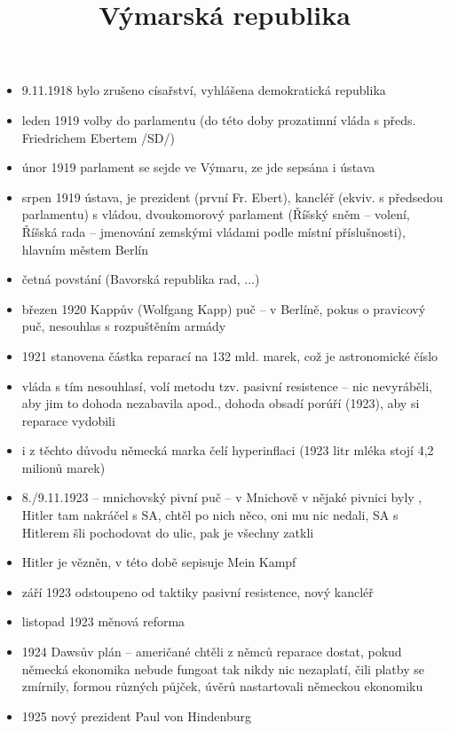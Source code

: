 \documentclass{article}
\title{\vspace{-2cm}\Kapitan Výmarská republika\vspace{-1.7cm}}
\date{}
\author{}
\begin{document}
\maketitle

\begin{itemize}
  \vspace{-0.5em}
  \setlength\itemsep{0.15em}
  \item 9.11.1918 bylo zrušeno císařství, vyhlášena demokratická republika
  \item leden 1919 volby do parlamentu (do této doby prozatimní vláda s předs. Friedrichem Ebertem /SD/)
  \item únor 1919 parlament se sejde ve Výmaru, ze jde sepsána i ústava
  \item srpen 1919 ústava, je prezident (první Fr. Ebert), kancléř (ekviv. s předsedou parlamentu) s vládou, dvoukomorový parlament (Říšský sněm -- volení, Říšská rada -- jmenování zemskými vládami podle místní příslušnosti), hlavním městem Berlín
  \item četná povstání (Bavorská republika rad, ...)
  \item březen 1920 Kappův (Wolfgang Kapp) puč -- v Berlíně, pokus o pravicový puč, nesouhlas s rozpuštěním armády
  \item 1921 stanovena částka reparací na 132 mld. marek, což je astronomické číslo
  \item vláda s tím nesouhlasí, volí metodu tzv. pasivní resistence -- nic nevyráběli, aby jim to dohoda nezabavila apod., dohoda obsadí porúří (1923), aby si reparace vydobili
  \item i z těchto důvodu německá marka čelí hyperinflaci (1923 litr mléka stojí 4,2 milionů marek)
  \item 8./9.11.1923 -- mnichovský pivní puč -- v Mnichově v nějaké pivnici byly , Hitler tam nakráčel s SA, chtěl po nich něco, oni mu nic nedali, SA s Hitlerem šli pochodovat do ulic, pak je všechny zatkli
  \item Hitler je vězněn, v této době sepisuje Mein Kampf
  \item září 1923 odstoupeno od taktiky pasivní resistence, nový kancléř
  \item listopad 1923 měnová reforma
  \item 1924 Dawsův plán -- američané chtěli z němců reparace dostat, pokud německá ekonomika nebude fungoat tak nikdy nic nezaplatí, čili platby se zmírnily, formou různých půjček, úvěrů nastartovali německou ekonomiku
  \item 1925 nový prezident Paul von Hindenburg

\end{itemize}
\end{document}
